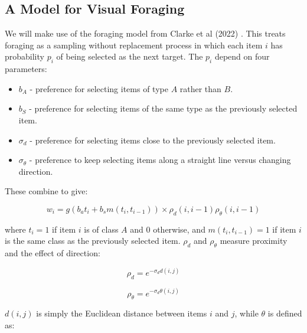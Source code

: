 \documentclass[preprints, article,submit,pdftex,moreauthors]{Definitions/mdpi}
\begin{document}
\subsection{A Model for Visual Foraging}

We will make use of the foraging model from Clarke et al (2022) \cite{clarke2022foraging}. This treats foraging as a sampling without replacement process in which each item $i$ has probability $p_i$ of being selected as the next target. The $p_i$ depend on four parameters:

\begin{itemize}
    \item $b_A$ - preference for selecting items of type $A$ rather than $B$.
    \item $b_S$ - preference for selecting items of the same type as the previously selected item.
    \item $\sigma_d$ - preference for selecting items close to the previously selected item.
    \item $\sigma_{\theta}$ - preference to keep selecting items along a straight line versus changing direction.
\end{itemize}

These combine to give:

\begin{linenomath}
\begin{equation}
    w_i = g\left(b_at_i + b_sm(t_i, t_{i-1})\right) \times \rho_d(i, i-1) \rho_{\theta}(i, i-1)
\end{equation}
\end{linenomath}

where $t_i = 1$ if item $i$ is of class $A$ and 0 otherwise, and  $m(t_i, t_{i-1}) =1$ if item $i$ is the same class as the previously selected item. $\rho_d$ and $\rho_{\theta}$ measure proximity and the effect of direction:

\begin{linenomath}
\begin{equation}
    \rho_d = e^{-\sigma_dd(i,j)}
\end{equation}
\end{linenomath}

\begin{linenomath}
\begin{equation}
    \rho_{\theta} = e^{-\sigma_d\theta(i,j)}
\end{equation}
\end{linenomath}

$d(i,j)$ is simply the Euclidean distance between items $i$ and $j$, while $\theta$ is defined as:
\end{document}
